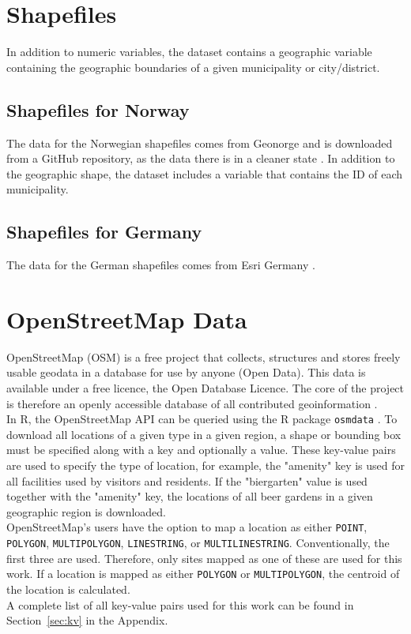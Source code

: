 \section{Shapefiles}
In addition to numeric variables, the dataset contains a geographic variable containing the geographic boundaries of a given municipality or city/district.
\subsection{Shapefiles for Norway}
The data for the Norwegian shapefiles comes from Geonorge \autocite[][]{geonorge} and is downloaded from a GitHub repository, as the data there is in a cleaner state \autocite[][]{shapeGithub}. In addition to the geographic shape, the dataset includes a variable that contains the ID of each municipality.
\subsection{Shapefiles for Germany}
The data for the German shapefiles comes from Esri Germany \autocite[][]{esri}.
\clearpage
\section{OpenStreetMap Data}
OpenStreetMap (OSM) is a free project that collects, structures and stores freely usable geodata in a database for use by anyone (Open Data). This data is available under a free licence, the Open Database Licence. The core of the project is therefore an openly accessible database of all contributed geoinformation \autocite[][]{OpenStreetMap}. \\
In R, the OpenStreetMap API can be queried using the R package \texttt{osmdata} \autocite[][]{osmdata}. To download all locations of a given type in a given region, a shape or bounding box must be specified along with a key and optionally a value. These key-value pairs are used to specify the type of location, for example, the "amenity" key is used for all facilities used by visitors and residents. If the "biergarten" value is used together with the "amenity" key, the locations of all beer gardens in a given geographic region is downloaded. \\
OpenStreetMap's users have the option to map a location as either \texttt{POINT}, \texttt{POLYGON}, \texttt{MULTIPOLYGON}, \texttt{LINESTRING}, or \texttt{MULTILINESTRING}. Conventionally, the first three are used. Therefore, only sites mapped as one of these are used for this work. If a location is mapped as either \texttt{POLYGON} or \texttt{MULTIPOLYGON}, the centroid of the location is calculated. \\
A complete list of all key-value pairs used for this work can be found in Section~\ref{sec:kv} in the Appendix. 
\clearpage
